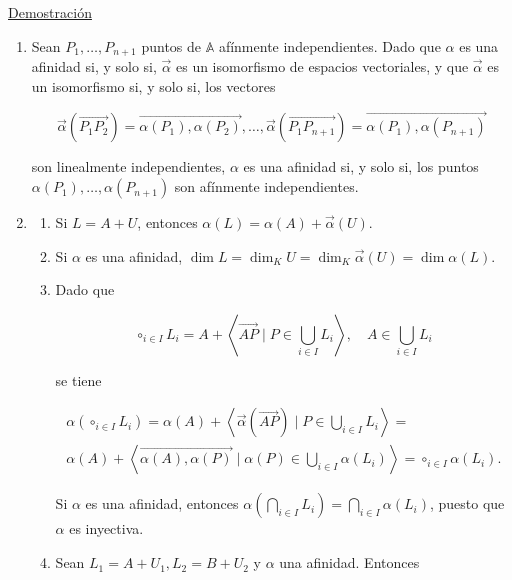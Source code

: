 \documentclass[12pt, a4paper, ones, notitlepage, openany,titlepage]{article}
\newcommand{\demostracion}{\noindent\underline{Demostración}}
\begin{document}
\demostracion 
\begin{enumerate}[label=(\arabic*)]
	
	\item Sean $P_{1}, \ldots, P_{n+1}$ puntos de $\mathbb{A}$ afínmente independientes. Dado que $\alpha$ es una afinidad si, y solo si, $\vec{\alpha}$ es un isomorfismo de espacios vectoriales, y que $\vec{\alpha}$ es un isomorfismo si, y solo si, los vectores
	
	$$
	\vec{\alpha}\left(\overrightarrow{P_{1} P_{2}}\right)=\overrightarrow{\alpha\left(P_{1}\right), \alpha\left(P_{2}\right)}, \ldots, \vec{\alpha}\left(\overrightarrow{P_{1} P_{n+1}}\right)=\overrightarrow{\alpha\left(P_{1}\right), \alpha\left(P_{n+1}\right)}
	$$
	
	son linealmente independientes, $\alpha$ es una afinidad si, y solo si, los puntos $\alpha\left(P_{1}\right), \ldots, \alpha\left(P_{n+1}\right)$ son afínmente independientes.
	
	\item 
	\begin{enumerate}[label=(\alph*)]
		\item Si $L=A+U$, entonces $\alpha(L)=\alpha(A)+\vec{\alpha}(U)$.
		
		\item Si $\alpha$ es una afinidad, $\dim  L=\dim _{K} U=\dim _{K} \vec{\alpha}(U)=\dim  \alpha(L)$.
		
		\item Dado que
		
		$$
		\circ_{i \in I} L_{i}=A+\left\langle\overrightarrow{A P} \mid P \in \bigcup_{i \in I} L_{i}\right\rangle, \quad A \in \bigcup_{i \in I} L_{i}
		$$
		
		se tiene
		
		\begin{gather*}
			\alpha\left(\circ_{i \in I} L_{i}\right)=\alpha(A)+\left\langle\vec{\alpha}(\overrightarrow{A P}) \mid P \in \bigcup_{i \in I} L_{i}\right\rangle=\\
			\alpha(A)+\left\langle\overrightarrow{\alpha(A), \alpha(P)} \mid \alpha(P) \in \bigcup_{i \in I} \alpha\left(L_{i}\right)\right\rangle=\circ_{i \in I} \alpha\left(L_{i}\right) .
		\end{gather*}
		
		Si $\alpha$ es una afinidad, entonces $\alpha\left(\bigcap_{i \in I} L_{i}\right)=\bigcap_{i \in I} \alpha\left(L_{i}\right)$, puesto que $\alpha$ es inyectiva.
		
		\item Sean $L_{1}=A+U_{1}, L_{2}=B+U_{2}$ y $\alpha$ una afinidad. Entonces
		

\end{enumerate}
\end{enumerate}
\end{document}
